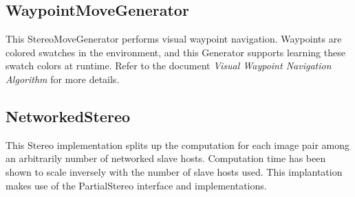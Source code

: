 \documentclass[12pt]{article}
\begin{document}
\subsection{WaypointMoveGenerator}
This StereoMoveGenerator performs visual waypoint navigation.  Waypoints are colored swatches in the environment, and this Generator supports learning these swatch colors at runtime.  Refer to the document {\it Visual Waypoint Navigation Algorithm} for more details.
\subsection{NetworkedStereo}
This Stereo implementation splits up the computation for each image pair among an arbitrarily number of networked slave hosts.  Computation time has been shown to scale inversely with the number of slave hosts used.  This implantation makes use of the PartialStereo interface and implementations.
\end{document}
